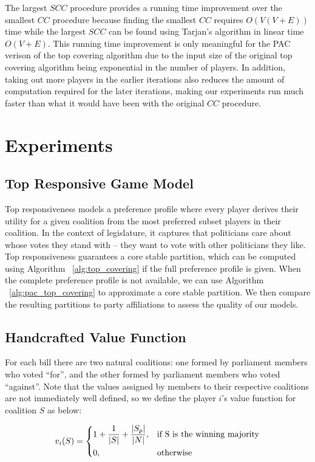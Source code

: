 \documentclass[letterpaper]{article} %
\begin{document}
The largest $SCC$ procedure provides a running time improvement over the smallest $CC$ procedure because finding the smallest $CC$ requires $O(V(V + E))$ time while the largest $SCC$ can be found using Tarjan's algorithm in linear time $O(V + E)$\cite{Tarjan72depthfirst}. This running time improvement is only meaningful for the PAC verison of the top covering algorithm due to the input size of the original top covering algorithm being exponential in the number of players. In addition, taking out more players in the earlier iterations also reduces the amount of computation required for the later iterations, making our experiments run much faster than what it would have been with the original $CC$ procedure.

\section{Experiments}

\subsection{Top Responsive Game Model}
Top responsiveness models a preference profile where every player derives their utility for a given coalition from the most preferred subset players in their coalition. In the context of legislature, it captures that politicians care about whose votes they stand with – they want to vote with other politicians they like. Top responsiveness guarantees a core stable partition, which can be computed using Algorithm ~\ref{alg:top_covering} if the full preference profile is given. When the complete preference profile is not available, we can use Algorithm ~\ref{alg:pac_top_covering} to approximate a core stable partition. We then compare the resulting partitions to party affiliations to assess the quality of our models.

\subsection{Handcrafted Value Function}
For each bill there are two natural coalitions: one formed by parliament members who voted ``for'', and the other formed by parliament members who voted ``against''. Note that the values assigned by members to their respective coalitions are not immediately well defined, so we define the player $i$'s value function for coalition $S$ as below:

\[
  v_i(S) = 
  \begin{dcases}
      1 + \frac{1}{|S|} + \frac{|S_p|}{|N|},& \text{if S is the winning majority}\\
      0,              & \text{otherwise}
  \end{dcases}
\]
\end{document}
